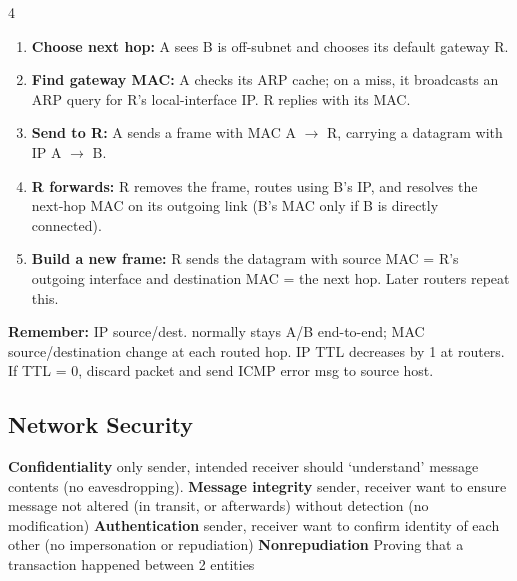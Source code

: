 \documentclass[10pt]{extarticle}
\newenvironment{compactfigure}{\par\begingroup\setlength{\parskip}{0pt}\noindent
\begin{minipage}{\linewidth}\centering}{
\end{minipage}\par\endgroup}
\begin{document}
\begin{multicols}{4}
\begin{compactfigure}
{%
}
\end{compactfigure}
\begin{enumerate}
\item \textbf{Choose next hop:} A sees B is off-subnet and chooses its default gateway R.
\item \textbf{Find gateway MAC:} A checks its ARP cache; on a miss, it broadcasts an ARP query for R's local-interface IP. R replies with its MAC.
\item \textbf{Send to R:} A sends a frame with MAC A $\rightarrow$ R, carrying a datagram with IP A $\rightarrow$ B.
\item \textbf{R forwards:} R removes the frame, routes using B's IP, and resolves the next-hop MAC on its outgoing link (B's MAC only if B is directly connected).
\item \textbf{Build a new frame:} R sends the datagram with source MAC = R's outgoing interface and destination MAC = the next hop. Later routers repeat this.
\end{enumerate}
\textbf{Remember:} IP source/dest. normally stays A/B end-to-end; MAC source/destination change at each routed hop.
IP TTL decreases by 1 at routers. If TTL = 0, discard packet and send ICMP error msg to source host.

\subsection{Network Security}
\textbf{Confidentiality} only sender, intended
receiver should `understand' message contents (no eavesdropping).
\textbf{Message integrity} sender, receiver want to ensure message not altered (in transit, or afterwards) without detection (no modification)
\textbf{Authentication} sender, receiver want to
confirm identity of each other (no impersonation or repudiation)
\textbf{Nonrepudiation} Proving that a transaction happened between 2 entities


\end{multicols}
\end{document}
